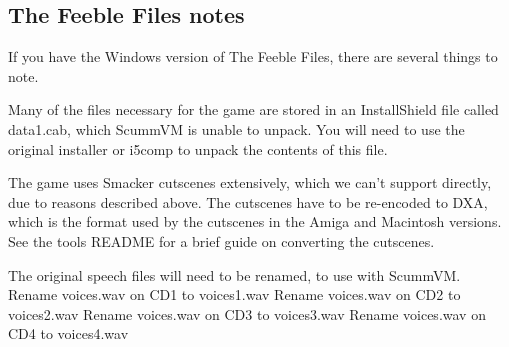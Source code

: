 \subsection{The Feeble Files notes}

If you have the Windows version of The Feeble Files, there are several things
to note. 

Many of the files necessary for the game are stored in an InstallShield file
called data1.cab, which ScummVM is unable to unpack. You will need to use the
original installer or i5comp to unpack the contents of this file.

The game uses Smacker cutscenes extensively, which we can't support directly,
due to reasons described above. The cutscenes have to be re-encoded to DXA,
which is the format used by the cutscenes in the Amiga and Macintosh versions.
See the tools README for a brief guide on converting the cutscenes.

The original speech files will need to be renamed, to use with ScummVM.
Rename voices.wav on CD1 to voices1.wav
Rename voices.wav on CD2 to voices2.wav
Rename voices.wav on CD3 to voices3.wav
Rename voices.wav on CD4 to voices4.wav


